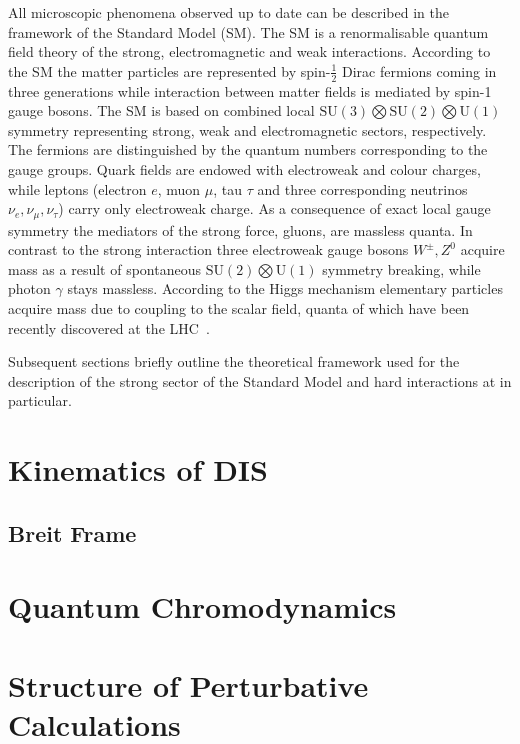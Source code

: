 All microscopic phenomena observed up to date can be described in the framework of the Standard Model (SM). The SM is a renormalisable quantum field theory of the strong, electromagnetic and weak interactions. According to the SM the matter particles are represented by spin-$\frac{1}{2}$ Dirac fermions coming in three generations while interaction between matter fields is mediated by spin-1 gauge bosons. The SM is based on combined local $\mathrm{SU}\left(3\right) \bigotimes \mathrm{SU}\left(2\right) \bigotimes \mathrm{U}\left(1\right)$ symmetry representing strong, weak and electromagnetic sectors, respectively. The fermions are distinguished by the quantum numbers corresponding to the gauge groups. Quark fields are endowed with electroweak and colour charges, while leptons (electron $e$, muon $\mu$, tau $\tau$ and three corresponding neutrinos $\nu_e, \nu_\mu, \nu_\tau$) carry only electroweak charge. As a consequence of exact local gauge symmetry the mediators of the strong force, gluons, are massless quanta. In contrast to the strong interaction three electroweak gauge bosons $W^\pm, Z^0$ acquire mass as a result of spontaneous $\mathrm{SU}\left(2\right) \bigotimes \mathrm{U}\left(1\right)$ symmetry breaking, while photon $\gamma$ stays massless. According to the Higgs mechanism elementary particles acquire mass due to coupling to the scalar field, quanta of which have been recently discovered at the LHC~\cite{higgs atlas cms}.

Subsequent sections briefly outline the theoretical framework used for the description of the strong sector of the Standard Model and hard interactions at \hera in particular.

\section{Kinematics of DIS}
\label{sec:kindis}


\subsection{Breit Frame}
\label{subsec:breitframe}


\section{Quantum Chromodynamics}


\section{Structure of Perturbative Calculations}


